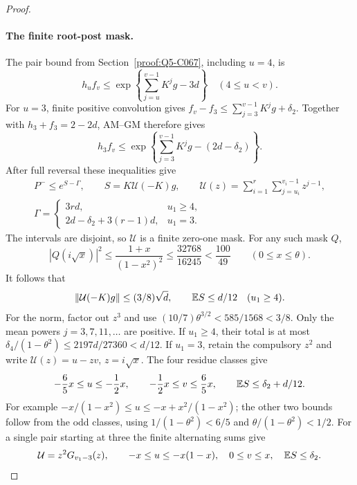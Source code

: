 \begin{proof}
\paragraph{The finite root-post mask.}\label{part:root-post:mask-proof}
The pair bound from Section~\ref{proof:Q5-C067}, including \(u=4\), is
\[
 h_uf_v\le
 \exp\left\{\sum_{j=u}^{v-1}K^jg-3d\right\}
 \quad(4\le u<v).
 \tag{Q78.1.6}
\]
For \(u=3\), finite positive convolution gives
\(f_v-f_3\le\sum_{j=3}^{v-1}K^jg+\delta_2\).
Together with \(h_3+f_3=2-2d\), AM--GM therefore gives
\[
 h_3f_v\le
 \exp\left\{\sum_{j=3}^{v-1}K^jg-(2d-\delta_2)\right\}.
 \tag{Q78.1.7}
\]
After full reversal these inequalities give
\begin{equation}\label{eq:root-post:mask}
 \begin{gathered}
 P^-\le e^{S-\Gamma},\qquad S=K\mathcal U(-K)g,\qquad
 \mathcal U(z)=\sum_{i=1}^r\sum_{j=u_i}^{v_i-1}z^{j-1},\\
 \Gamma=
 \begin{cases}
 3rd,&u_1\ge4,\\
 2d-\delta_2+3(r-1)d,&u_1=3.
 \end{cases}
 \end{gathered}
\end{equation}
The intervals are disjoint, so \(\mathcal U\) is a finite zero-one
mask. For any such mask \(Q\),
\[
 |Q(i\sqrt x)|^2\le\frac{1+x}{(1-x^2)^2}
 \le\frac{32768}{16245}<\frac{100}{49}
 \qquad(0\le x\le\theta).
\]
It follows that
\begin{equation}\label{eq:root-post:late-mask}
 \|\mathcal U(-K)g\|\le(3/8)\sqrt d,\qquad
 \mathbb E S\le d/12\quad(u_1\ge4).
\end{equation}
For the norm, factor out \(z^3\) and use
\((10/7)\theta^{3/2}<585/1568<3/8\).
Only the mean powers \(j=3,7,11,\ldots\) are positive.
If \(u_1\ge4\), their total is at most
\(\delta_4/(1-\theta^2)\le2197d/27360<d/12\).
If \(u_1=3\), retain the compulsory \(z^2\) and write
\(\mathcal U(z)=u-zv\), \(z=i\sqrt x\). The four residue classes give
\begin{equation}\label{eq:root-post:mask-coordinates}
 -\frac65x\le u\le-\frac12x,\qquad
 -\frac12x\le v\le\frac65x,\qquad
 \mathbb E S\le\delta_2+d/12 .
\end{equation}
For example
\(-x/(1-x^2)\le u\le-x+x^2/(1-x^2)\); the other two bounds follow
from the odd classes, using \(1/(1-\theta^2)<6/5\) and
\(\theta/(1-\theta^2)<1/2\).
For a single pair starting at three the finite alternating sums give
\begin{equation}\label{eq:root-post:single-mask}
 \mathcal U=z^2G_{v_1-3}(z),\qquad
 -x\le u\le-x(1-x),\quad 0\le v\le x,\quad
 \mathbb E S\le\delta_2 .
\end{equation}


\end{proof}
